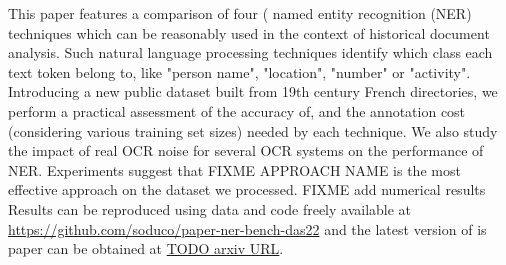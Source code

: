 This paper features a comparison of four ( named entity recognition (NER) techniques which can be reasonably used in the context of historical document analysis.
Such natural language processing techniques identify which class each text token belong to, like "person name", "location", "number" or "activity".
Introducing a new public dataset built from 19th century French directories, 
we perform a practical assessment of the accuracy of, and the annotation cost (considering various training set sizes) needed by each technique.
We also study the impact of real OCR noise for several OCR systems on the performance of NER.
Experiments suggest that FIXME APPROACH NAME is the most effective approach on the dataset we processed.
FIXME add numerical results
Results can be reproduced using data and code freely available at \url{https://github.com/soduco/paper-ner-bench-das22}
and the latest version of is paper can be obtained at \url{TODO arxiv URL}.